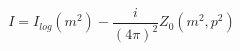 \begin{equation}
I=I_{log}(m^{2})-\frac{i}{(4\pi )^{2}}Z_{0}(m^{2},p^{2})  \label{4}
\end{equation}

